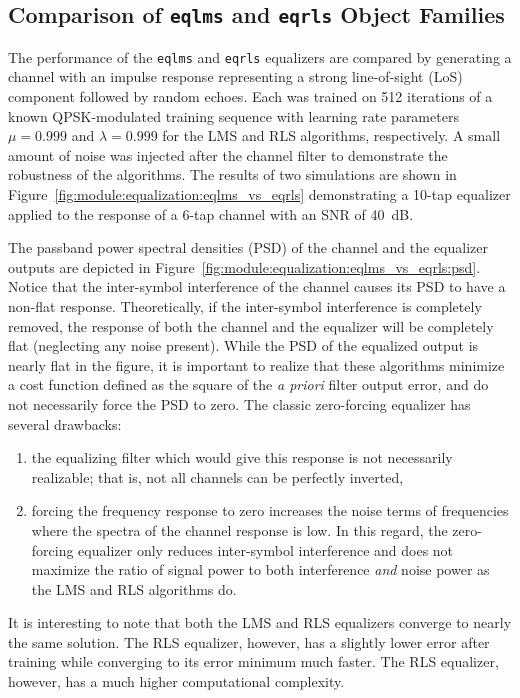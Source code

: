 \subsection{Comparison of {\tt eqlms} and {\tt eqrls} Object Families}
\label{module:equalization:eqlms_vs_eqrls}
The performance of the {\tt eqlms} and {\tt eqrls} equalizers are compared by
generating a channel with an impulse response representing a strong
line-of-sight (LoS) component followed by random echoes.
Each was trained on 512 iterations of a known QPSK-modulated training sequence
with learning rate parameters $\mu=0.999$ and $\lambda=0.999$ for the LMS and
RLS algorithms, respectively.
A small amount of noise was injected after the channel filter to demonstrate
the robustness of the algorithms.
The results of two simulations are shown in
Figure~\ref{fig:module:equalization:eqlms_vs_eqrls}
demonstrating a 10-tap equalizer applied to the response of a 6-tap
channel with an SNR of 40~dB.

The passband power spectral densities (PSD) of the channel and the equalizer
outputs are depicted in
Figure~\ref{fig:module:equalization:eqlms_vs_eqrls:psd}.
Notice that the inter-symbol interference of the channel causes its PSD to
have a non-flat response.
Theoretically, if the inter-symbol interference is completely removed, the
response of both the channel and the equalizer will be completely flat
(neglecting any noise present).
While the PSD of the equalized output is nearly flat in the figure,
it is important to realize that these algorithms minimize a cost function
defined as the square of the {\it a priori} filter output error, and do not
necessarily force the PSD to zero.
The classic zero-forcing equalizer has several drawbacks:
\begin{enumerate}
\item the equalizing filter which would give this response is not
      necessarily realizable; that is, not all channels can be
      perfectly inverted,
\item forcing the frequency response to zero increases the noise
      terms of frequencies where the spectra of the channel
      response is low.  In this regard, the zero-forcing equalizer
      only reduces inter-symbol interference and does not maximize
      the ratio of signal power to both interference {\it and}
      noise power as the LMS and RLS algorithms do.
\end{enumerate}
It is interesting to note that both the LMS and RLS equalizers converge to
nearly the same solution.
The RLS equalizer, however, has a slightly lower error after
training while converging to its error minimum much faster.
The RLS equalizer, however, has a much higher computational complexity.


